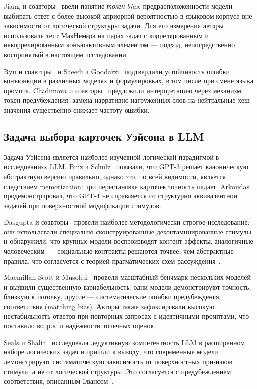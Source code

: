 Jiang и соавторы~\cite{jiang2024peek} ввели понятие \textit{токен-bias}: предрасположенности модели выбирать ответ с более высокой априорной вероятностью в языковом корпусе вне зависимости от логической структуры задачи. Для его измерения авторы использовали тест МакНемара на парах задач с коррелированным и некоррелированным конъюнктивным элементом --- подход, непосредственно воспринятый в настоящем исследовании.

Ryu и соавторы~\cite{ryu2024representativeness} и Saeedi и Goodarzi~\cite{saeedi2024gpt} подтвердили устойчивость ошибки конъюнкции в различных моделях и формулировках, в том числе при смене языка промпта. Chadimova и соавторы~\cite{chadimova2024meaningless} предложили интерпретацию через механизм токен-предубеждения: замена нарративно нагруженных слов на нейтральные хеш-значения существенно снижает частоту ошибки.

\subsection{Задача выбора карточек Уэйсона в LLM}

Задача Уэйсона является наиболее изученной логической парадигмой в исследованиях LLM. Binz и Schulz~\cite{binz2023using} показали, что GPT-3 решает каноническую абстрактную версию правильно, однако это, по всей видимости, является следствием memorization: при перестановке карточек точность падает. Arkoudas~\cite{arkoudas2023gpt4} продемонстрировал, что GPT-4 не справляется со структурно эквивалентной задачей при поверхностной модификации стимулов.

Dasgupta и соавторы~\cite{dasgupta2024language} провели наиболее методологически строгое исследование: они использовали специально сконструированные деконтаминированные стимулы и обнаружили, что крупные модели воспроизводят контент-эффекты, аналогичные человеческим~--- социальные контракты решаются точнее, чем абстрактные правила, что согласуется с теорией прагматических схем рассуждения~\cite{cheng1985pragmatic}.

Macmillan-Scott и Musolesi~\cite{macmillan2024irrationality} провели масштабный бенчмарк нескольких моделей и выявили существенную вариабельность: одни модели демонстрируют точность, близкую к потолку, другие --- систематические ошибки предубеждения соответствия (matching bias). Авторы также зафиксировали высокую нестабильность ответов при повторных запросах с идентичными промптами, что поставило вопрос о надёжности точечных оценок.

Seals и Shalin~\cite{seals2024evaluating} исследовали дедуктивную компетентность LLM в расширенном наборе логических задач и пришли к выводу, что современные модели демонстрируют систематическую зависимость от поверхностных признаков стимула, а не от логической структуры. Это согласуется с предубеждением соответствия, описанным Эвансом~\cite{evans1998matching}.

